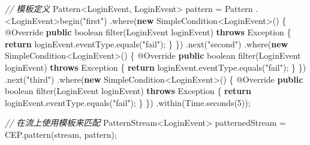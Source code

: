 \documentclass[cn,11pt,chinese]{elegantbook}
\newenvironment{Shaded}{}{}
\newcommand{\AttributeTok}[1]{\textcolor[rgb]{0.49,0.56,0.16}{#1}}
\newcommand{\BuiltInTok}[1]{#1}
\newcommand{\CommentTok}[1]{\textcolor[rgb]{0.38,0.63,0.69}{\textit{#1}}}
\newcommand{\DataTypeTok}[1]{\textcolor[rgb]{0.56,0.13,0.00}{#1}}
\newcommand{\DecValTok}[1]{\textcolor[rgb]{0.25,0.63,0.44}{#1}}
\newcommand{\FunctionTok}[1]{\textcolor[rgb]{0.02,0.16,0.49}{#1}}
\newcommand{\KeywordTok}[1]{\textcolor[rgb]{0.00,0.44,0.13}{\textbf{#1}}}
\newcommand{\NormalTok}[1]{#1}
\newcommand{\StringTok}[1]{\textcolor[rgb]{0.25,0.44,0.63}{#1}}
\begin{document}
\begin{Shaded}
\begin{Highlighting}[]
        \CommentTok{// 模板定义}
        \BuiltInTok{Pattern}\NormalTok{\textless{}LoginEvent, LoginEvent\textgreater{} pattern = }\BuiltInTok{Pattern}
\NormalTok{            .\textless{}LoginEvent\textgreater{}}\FunctionTok{begin}\NormalTok{(}\StringTok{"first"}\NormalTok{)}
\NormalTok{            .}\FunctionTok{where}\NormalTok{(}\KeywordTok{new}\NormalTok{ SimpleCondition\textless{}LoginEvent\textgreater{}() \{}
                \AttributeTok{@Override}
                \KeywordTok{public} \DataTypeTok{boolean} \FunctionTok{filter}\NormalTok{(LoginEvent loginEvent) }\KeywordTok{throws} \BuiltInTok{Exception}\NormalTok{ \{}
                    \KeywordTok{return}\NormalTok{ loginEvent.}\FunctionTok{eventType}\NormalTok{.}\FunctionTok{equals}\NormalTok{(}\StringTok{"fail"}\NormalTok{);}
\NormalTok{                \}}
\NormalTok{            \})}
\NormalTok{            .}\FunctionTok{next}\NormalTok{(}\StringTok{"second"}\NormalTok{)}
\NormalTok{            .}\FunctionTok{where}\NormalTok{(}\KeywordTok{new}\NormalTok{ SimpleCondition\textless{}LoginEvent\textgreater{}() \{}
                \AttributeTok{@Override}
                \KeywordTok{public} \DataTypeTok{boolean} \FunctionTok{filter}\NormalTok{(LoginEvent loginEvent) }\KeywordTok{throws} \BuiltInTok{Exception}\NormalTok{ \{}
                    \KeywordTok{return}\NormalTok{ loginEvent.}\FunctionTok{eventType}\NormalTok{.}\FunctionTok{equals}\NormalTok{(}\StringTok{"fail"}\NormalTok{);}
\NormalTok{                \}}
\NormalTok{            \})}
\NormalTok{            .}\FunctionTok{next}\NormalTok{(}\StringTok{"third"}\NormalTok{)}
\NormalTok{            .}\FunctionTok{where}\NormalTok{(}\KeywordTok{new}\NormalTok{ SimpleCondition\textless{}LoginEvent\textgreater{}() \{}
                \AttributeTok{@Override}
                \KeywordTok{public} \DataTypeTok{boolean} \FunctionTok{filter}\NormalTok{(LoginEvent loginEvent) }\KeywordTok{throws} \BuiltInTok{Exception}\NormalTok{ \{}
                    \KeywordTok{return}\NormalTok{ loginEvent.}\FunctionTok{eventType}\NormalTok{.}\FunctionTok{equals}\NormalTok{(}\StringTok{"fail"}\NormalTok{);}
\NormalTok{                \}}
\NormalTok{            \})}
\NormalTok{            .}\FunctionTok{within}\NormalTok{(}\BuiltInTok{Time}\NormalTok{.}\FunctionTok{seconds}\NormalTok{(}\DecValTok{5}\NormalTok{));}
        
        \CommentTok{// 在流上使用模板来匹配}
\NormalTok{        PatternStream\textless{}LoginEvent\textgreater{} patternedStream = CEP.}\FunctionTok{pattern}\NormalTok{(stream, pattern);}
        

\end{Highlighting}
\end{Shaded}
\end{document}
